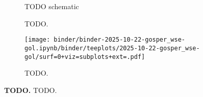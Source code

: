 \begin{figure}

\begin{minipage}[c]{0.7\linewidth}%
\vspace*{0pt}%
\begin{subfigure}[t]{0.25\linewidth}
    TODO schematic
    \caption{\footnotesize
    TODO.
    }
    \label{fig:use-case-gol:schematic}
\end{subfigure}%
\begin{subfigure}[t]{0.75\linewidth}
    \centering
    \texttt{[image: binder/binder-2025-10-22-gosper\_wse-gol.ipynb/binder/teeplots/2025-10-22-gosper\_wse-gol/surf=0+viz=subplots+ext=.pdf]}
    \caption{\footnotesize
    TODO.
    }
    \label{fig:use-case-gol:phylo}
\end{subfigure}
\end{minipage}%
\begin{minipage}[c]{0.3\linewidth}%
\vspace{0pt}%
\caption{%
\textbf{TODO.}
\footnotesize
TODO.
}
\label{fig:use-case-gol}
\end{minipage}
\end{figure}
